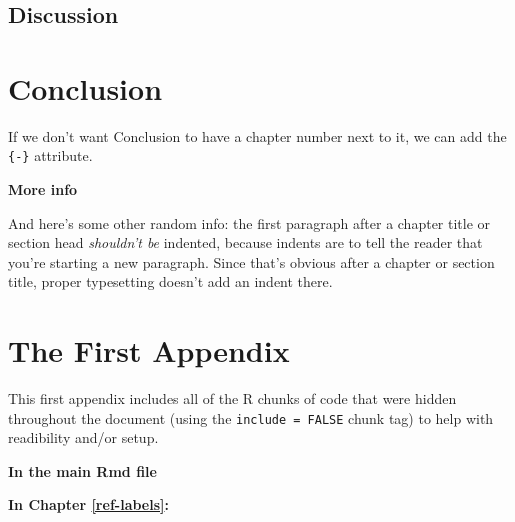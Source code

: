 \documentclass[12pt,twoside]{reedthesis}
\theoremstyle{definition}
\theoremstyle{definition}
\theoremstyle{definition}
\theoremstyle{remark}
\begin{document}
\chapter{}\label{section-5}

\section{Discussion}\label{discussion}

\chapter*{Conclusion}\label{conclusion}

If we don't want Conclusion to have a chapter number next to it, we can
add the \texttt{\{-\}} attribute.

\textbf{More info}

And here's some other random info: the first paragraph after a chapter
title or section head \emph{shouldn't be} indented, because indents are
to tell the reader that you're starting a new paragraph. Since that's
obvious after a chapter or section title, proper typesetting doesn't add
an indent there.

\appendix

\chapter{The First Appendix}\label{the-first-appendix}

This first appendix includes all of the R chunks of code that were
hidden throughout the document (using the \texttt{include\ =\ FALSE}
chunk tag) to help with readibility and/or setup.

\textbf{In the main Rmd file}
\begin{Shaded}
\begin{Highlighting}[]
\NormalTok{(}\OperatorTok{!}
  \NormalTok{(}\NormalTok{, } \NormalTok{)}
\NormalTok{(}\OperatorTok{!}
\OperatorTok{::}\NormalTok{(}\NormalTok{)}
\end{Highlighting}
\end{Shaded}
\textbf{In Chapter \ref{ref-labels}:}
\end{document}
